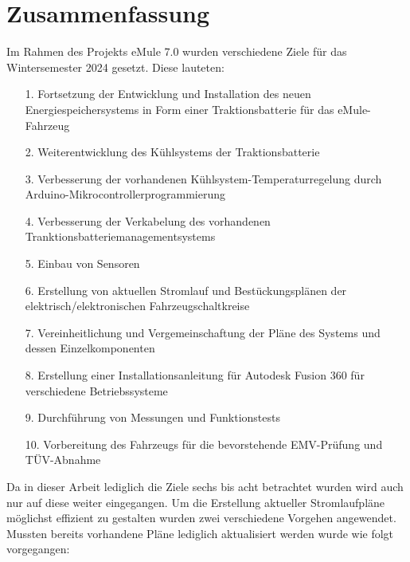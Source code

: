 \chapter{Zusammenfassung}
\label{cha:zusammenfassung}



	Im Rahmen des Projekts eMule 7.0 wurden verschiedene Ziele für das Wintersemester 2024 gesetzt. Diese lauteten:
	\begin{itemize}
		\item[1.] Fortsetzung der Entwicklung und Installation des neuen Energiespeichersystems in Form einer Traktionsbatterie für das eMule-Fahrzeug
		\item[2.] Weiterentwicklung des Kühlsystems der Traktionsbatterie
		\item[3.] Verbesserung der vorhandenen Kühlsystem-Temperaturregelung durch Arduino-Mikrocontrollerprogrammierung
		\item[4.] Verbesserung der Verkabelung des vorhandenen Tranktionsbatteriemanagementsystems
		\item[5.] Einbau von Sensoren
		\item[6.] Erstellung von aktuellen Stromlauf und Bestückungsplänen der elektrisch/elektronischen Fahrzeugschaltkreise
		\item[7.] Vereinheitlichung und Vergemeinschaftung der Pläne des Systems und dessen Einzelkomponenten
		\item[8.] Erstellung einer Installationsanleitung für Autodesk Fusion 360 für verschiedene Betriebssysteme
		\item[9.]Durchführung von Messungen und Funktionstests
		\item[10.] Vorbereitung des Fahrzeugs für die bevorstehende EMV-Prüfung und TÜV-Abnahme
	\end{itemize}
Da in dieser Arbeit lediglich die Ziele sechs bis acht betrachtet wurden wird auch nur auf diese weiter eingegangen. \newline
Um die Erstellung aktueller Stromlaufpläne möglichst effizient zu gestalten wurden zwei verschiedene Vorgehen angewendet. Mussten bereits vorhandene Pläne lediglich aktualisiert werden wurde wie folgt vorgegangen:\newline
